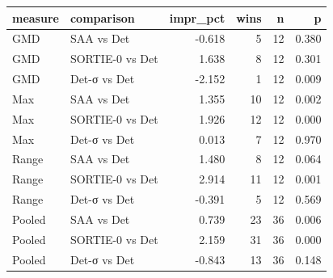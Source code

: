 \begin{tabular}{llrrrr}
\toprule
measure & comparison & impr\_pct & wins & n & p \\
\midrule
GMD & SAA vs Det & -0.618 & 5 & 12 & 0.380 \\
GMD & SORTIE-0 vs Det & 1.638 & 8 & 12 & 0.301 \\
GMD & Det-σ vs Det & -2.152 & 1 & 12 & 0.009 \\
Max & SAA vs Det & 1.355 & 10 & 12 & 0.002 \\
Max & SORTIE-0 vs Det & 1.926 & 12 & 12 & 0.000 \\
Max & Det-σ vs Det & 0.013 & 7 & 12 & 0.970 \\
Range & SAA vs Det & 1.480 & 8 & 12 & 0.064 \\
Range & SORTIE-0 vs Det & 2.914 & 11 & 12 & 0.001 \\
Range & Det-σ vs Det & -0.391 & 5 & 12 & 0.569 \\
Pooled & SAA vs Det & 0.739 & 23 & 36 & 0.006 \\
Pooled & SORTIE-0 vs Det & 2.159 & 31 & 36 & 0.000 \\
Pooled & Det-σ vs Det & -0.843 & 13 & 36 & 0.148 \\
\bottomrule
\end{tabular}
